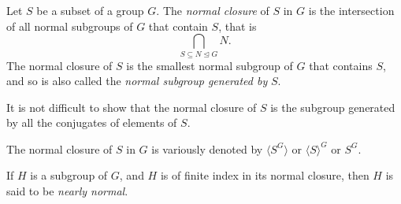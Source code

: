 \documentclass[12pt]{article}
\def\normal{\trianglelefteq}
\begin{document}
Let $S$ be a subset of a group $G$.
The \emph{normal closure} of $S$ in $G$ is the intersection of all normal subgroups of $G$ that contain $S$, that is
\[\bigcap_{S\subseteq N\normal G}\!\!N.\]
The normal closure of $S$ is the smallest normal subgroup of $G$ that contains $S$, and so is also called the \emph{normal subgroup generated by} $S$.

It is not difficult to show that the normal closure of $S$ is the subgroup generated by all the conjugates of elements of $S$.

The normal closure of $S$ in $G$ is variously denoted by 
$\langle S^G\rangle$ or $\langle S\rangle^G$ or $S^G$.

If $H$ is a subgroup of $G$,
and $H$ is of finite index in its normal closure,
then $H$ is said to be \emph{nearly normal}.
\end{document}
